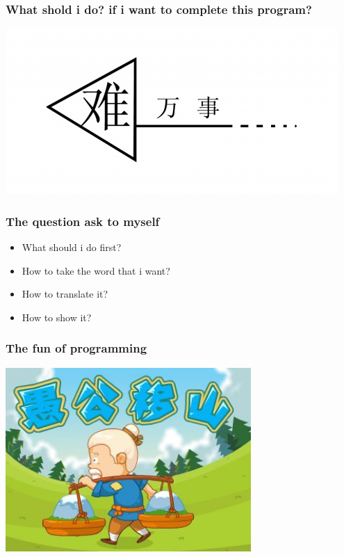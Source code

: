\documentclass[10pt]{beamer}
\begin{document}
\begin{frame}
  \frametitle{What shold i do? if i want to complete this program?}
\begin{center} 
  \includegraphics[width=1.\textwidth]{myfirststep.jpg}

\end{center}

\end{frame}
\begin{frame}
  \frametitle{The question ask to myself}
\begin{itemize}
  \item What should i do first?
  \item How to take the word that i want?
  \item How to translate it?
  \item How to show it?
\end{itemize}
\end{frame}

\begin{frame}
  \frametitle{The fun of programming}
  
\begin{center} 
  \includegraphics[width=0.7\textwidth]{challenge.jpg}

\end{center}

\end{frame}
\end{document}
